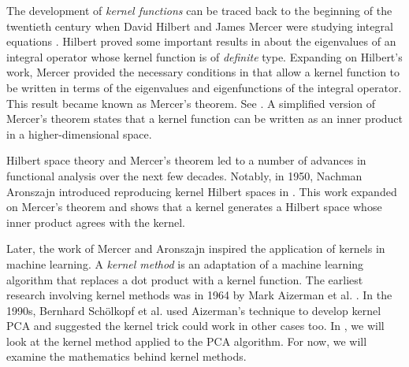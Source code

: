 The development of \textit{kernel functions} can be traced back to the beginning of the twentieth century when David Hilbert and James Mercer were studying integral equations \cite{hofmann2008kernel}.
Hilbert proved some important results in \cite{hilbert1912grundzüge} about the eigenvalues of an integral operator whose kernel function is of \textit{definite} type.
Expanding on Hilbert's work, Mercer provided the necessary conditions in \cite{mercer1909xvi} that allow a kernel function to be written in terms of the eigenvalues and eigenfunctions of the integral operator.
This result became known as Mercer's theorem.
See .
A simplified version of Mercer's theorem states that a kernel function can be written as an inner product in a higher-dimensional space.

Hilbert space theory and Mercer's theorem led to a number of advances in functional analysis over the next few decades.
Notably, in 1950, Nachman Aronszajn introduced reproducing kernel Hilbert spaces in \cite{aronszajn1950theory}.
This work expanded on Mercer's theorem and shows that a kernel generates a Hilbert space whose inner product agrees with the kernel.

Later, the work of Mercer and Aronszajn inspired the application of kernels in machine learning.
A \textit{kernel method} is an adaptation of a machine learning algorithm that replaces a dot product with a kernel function.
The earliest research involving kernel methods was in 1964 by Mark Aizerman et al. \cite{aizerman1964theoretical}.
In the 1990s, Bernhard Sch\"olkopf et al. used Aizerman's technique to develop kernel PCA and suggested the kernel trick could work in other cases too.
In , we will look at the kernel method applied to the PCA algorithm.
For now, we will examine the mathematics behind kernel methods.